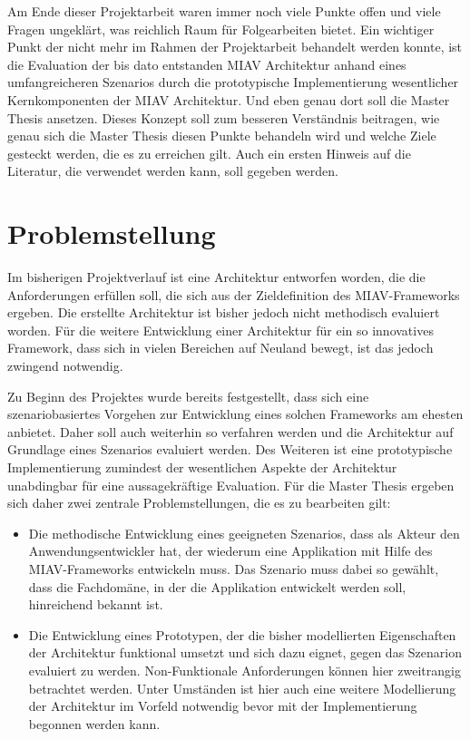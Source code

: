 \documentclass[11pt,headsepline,a4paper,bibtotoc,liststotoc,DIV12,BCOR12mm]{scrartcl}
\begin{document}
  Am Ende dieser Projektarbeit waren immer noch viele Punkte offen und viele Fragen ungeklärt, was reichlich Raum für Folgearbeiten bietet. Ein wichtiger Punkt der nicht mehr im Rahmen der Projektarbeit behandelt werden konnte, ist die Evaluation der bis dato entstanden MIAV Architektur anhand eines umfangreicheren Szenarios durch die prototypische Implementierung wesentlicher Kernkomponenten der MIAV Architektur. Und eben genau dort soll die Master Thesis ansetzen. Dieses Konzept soll zum besseren Verständnis beitragen, wie genau sich die Master Thesis diesen Punkte behandeln wird und welche Ziele gesteckt werden, die es zu erreichen gilt. Auch ein ersten Hinweis auf die Literatur, die verwendet werden kann, soll gegeben werden.


\section{Problemstellung} %
\label{sec:problemstellung}

  Im bisherigen Projektverlauf ist eine Architektur entworfen worden, die die Anforderungen erfüllen soll, die sich aus der Zieldefinition des MIAV-Frameworks ergeben. Die erstellte Architektur ist bisher jedoch nicht methodisch evaluiert worden. Für die weitere Entwicklung einer Architektur für ein so innovatives Framework, dass sich in vielen Bereichen auf Neuland bewegt, ist das jedoch zwingend notwendig.
  
  Zu Beginn des Projektes wurde bereits festgestellt, dass sich eine szenariobasiertes Vorgehen zur Entwicklung eines solchen Frameworks am ehesten anbietet. Daher soll auch weiterhin so verfahren werden und die Architektur auf Grundlage eines Szenarios evaluiert werden. Des Weiteren ist eine prototypische Implementierung zumindest der wesentlichen Aspekte der Architektur unabdingbar für eine aussagekräftige Evaluation. Für die Master Thesis ergeben sich daher zwei zentrale Problemstellungen, die es zu bearbeiten gilt:
  
  \begin{itemize}
    \item Die methodische Entwicklung eines geeigneten Szenarios, dass als Akteur den Anwendungsentwickler hat, der wiederum eine Applikation mit Hilfe des MIAV-Frameworks entwickeln muss. Das Szenario muss dabei so gewählt, dass die Fachdomäne, in der die Applikation entwickelt werden soll, hinreichend bekannt ist.
    \item Die Entwicklung eines Prototypen, der die bisher modellierten Eigenschaften der Architektur funktional umsetzt und sich dazu eignet, gegen das Szenarion evaluiert zu werden. Non-Funktionale Anforderungen können hier zweitrangig betrachtet werden. Unter Umständen ist hier auch eine weitere Modellierung der Architektur im Vorfeld notwendig bevor mit der Implementierung begonnen werden kann.
  \end{itemize}
\end{document}
